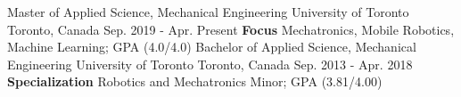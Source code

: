 \begin{cventries}
  \cventry
    {Master of Applied Science, Mechanical Engineering}
    {University of Toronto}
    {Toronto, Canada}
    {Sep. 2019 - Apr. Present}
    {\textbf{Focus} Mechatronics, Mobile Robotics, Machine Learning; GPA (4.0/4.0)}
  \cventry
    {Bachelor of Applied Science, Mechanical Engineering}
    {University of Toronto}
    {Toronto, Canada}
    {Sep. 2013 - Apr. 2018}
    {\textbf{Specialization} Robotics and Mechatronics Minor; GPA (3.81/4.00)}
\end{cventries}
